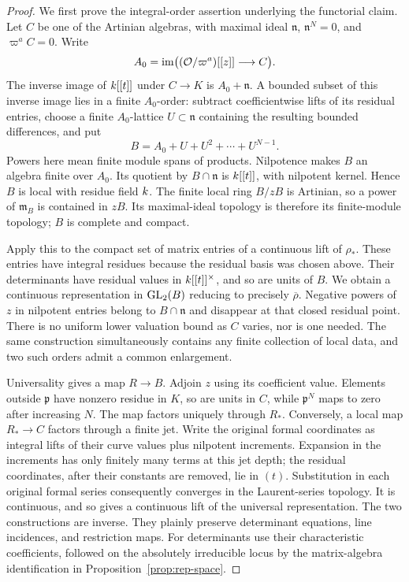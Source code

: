 \begin{proof}
We first prove the integral-order assertion underlying the functorial
claim.  Let $C$ be one of the Artinian algebras, with maximal ideal
$\mathfrak n$, $\mathfrak n^N=0$, and $\varpi^a C=0$.  Write
\[
A_0=\operatorname{im}\bigl((\mathcal O/\varpi^a)[[z]]\longrightarrow C\bigr).
\]
The inverse image of $k[[t]]$ under $C\to K$ is
$A_0+\mathfrak n$.  A bounded subset of this inverse image lies in a
finite $A_0$-order: subtract coefficientwise lifts of its residual
entries, choose a finite $A_0$-lattice $U\subset\mathfrak n$ containing
the resulting bounded differences, and put
\begin{equation}\label{eq:curve-order}
B=A_0+U+U^2+\cdots+U^{N-1}.
\end{equation}
Powers here mean finite module spans of products.  Nilpotence makes
$B$ an algebra finite over $A_0$.  Its quotient by
$B\cap\mathfrak n$ is $k[[t]]$, with nilpotent kernel.  Hence $B$
is local with residue field $k$.  The finite local ring $B/zB$ is
Artinian, so a power of $\mathfrak m_B$ is contained in $zB$.
Its maximal-ideal topology is therefore its finite-module topology;
$B$ is complete and compact.

Apply this to the compact set of matrix entries of a continuous lift
of $\rho_*$.  These entries have integral residues because the
residual basis was chosen above.  Their determinants have residual
values in $k[[t]]^\times$, and so are units of $B$.  We obtain a
continuous representation in $\operatorname{GL}_2(B)$ reducing to precisely
$\overline\rho$.  Negative powers of $z$ in nilpotent entries belong
to $B\cap\mathfrak n$ and disappear at that closed residual point.
There is no uniform lower valuation bound as $C$ varies, nor is one
needed.  The same construction simultaneously contains any finite
collection of local data, and two such orders admit a common
enlargement.

Universality gives a map $R\to B$.  Adjoin $z$ using its coefficient
value.  Elements outside $\mathfrak p$ have nonzero residue in $K$,
so are units in $C$, while $\mathfrak p^N$ maps to zero after
increasing $N$.  The map factors uniquely through $R_*$.  Conversely,
a local map $R_*\to C$ factors through a finite jet.  Write the
original formal coordinates as integral lifts of their curve values
plus nilpotent increments.  Expansion in the increments has only
finitely many terms at this jet depth; the residual coordinates,
after their constants are removed, lie in $(t)$.  Substitution in
each original formal series consequently converges in the
Laurent-series topology.  It is continuous, and so gives a continuous
lift of the universal representation.  The two constructions are
inverse.  They plainly preserve determinant equations, line
incidences, and restriction maps.  For determinants use their
characteristic coefficients, followed on the absolutely irreducible
locus by the matrix-algebra identification in
Proposition~\ref{prop:rep-space}.


\end{proof}

